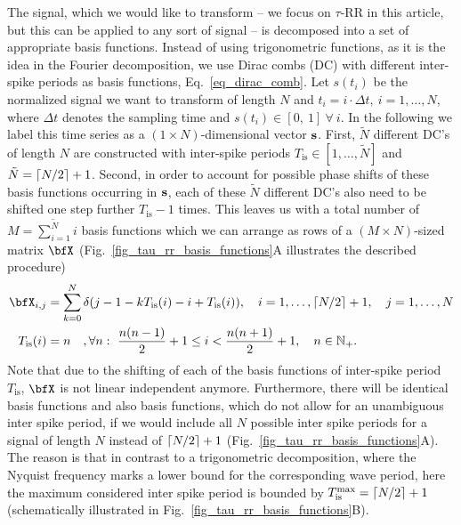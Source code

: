 \documentclass[entropy,article,submit,pdftex,moreauthors]{Definitions/mdpi}
\DeclarePairedDelimiter\ceil{\lceil}{\rceil}
\begin{document}
The signal, which we would like to transform -- we focus on $\tau$-RR in this article, but this can be applied to any sort of signal -- 
is decomposed into a set of appropriate basis functions. Instead of using trigonometric functions, as it is the idea in the Fourier decomposition, we use Dirac combs (DC) with 
different inter-spike periods as basis functions, Eq.~\eqref{eq_dirac_comb}. Let $s(t_i)$ be the normalized signal we want to transform of length $N$ and 
$t_i=i\cdot \Delta t,~i=1,\ldots,N$, where $\Delta t$ denotes the sampling time and $s(t_i) \in [0,\ 1]\ \forall\ i$. In the following we label this time series as a $(1\times N)$-dimensional 
vector $\bf{s}$. 
First, $\tilde{N}$ different DC's of length $N$ are constructed with inter-spike periods $T_\text{is} \in [1,\ldots,\tilde{N}]$ and $\tilde{N}=\ceil*{N/2}+1$. Second, in order to account 
for possible phase shifts of 
these basis functions occurring in $\bf{s}$, each of these $\tilde{N}$ different DC's also need to be shifted one step further $T_\text{is}-1$ times. This leaves us with a total number of 
$M = \sum_{i=1}^{\tilde{N}}i$ 
basis functions which we can arrange as rows of a $(M\times N)$-sized matrix $\bfX$
(Fig.~\ref{fig_tau_rr_basis_functions}A illustrates the described procedure) 
\begin{align}
\bfX_{i,j} &= \sum_{k=0}^{N}\delta\left(j-1-kT_\text{is}(i)-i+T_\text{is}(i) \right), \quad i=1,\dots,\ceil*{N/2}+1, \quad j=1,\dots,N\\
T_\text{is}(i)&= n \quad, \forall n:~ \frac{n(n-1)}{2} + 1 \leq i <  \frac{n(n+1)}{2} + 1,\quad n \in \mathbb{N}_+.
\label{eq_basis_matrix}
\end{align}
Note that due to the shifting of each of the basis functions of inter-spike period $T_\text{is}$, $\bfX$ is not linear independent anymore. 
Furthermore, there will be identical basis functions and also basis functions, which do not allow for an unambiguous inter spike period, 
if we would include all $N$ possible inter spike periods for a signal of length $N$ instead of $\ceil*{N/2}+1$ (Fig.~\ref{fig_tau_rr_basis_functions}A). 
The reason is that in contrast to a trigonometric decomposition, where the Nyquist frequency marks a lower bound for the corresponding wave period, here 
the maximum considered inter spike period is bounded by $T_{\text{is}}^{\text{max}} = \ceil*{N/2}+1$ (schematically illustrated in 
Fig.~\ref{fig_tau_rr_basis_functions}B).\\ 
\end{document}
